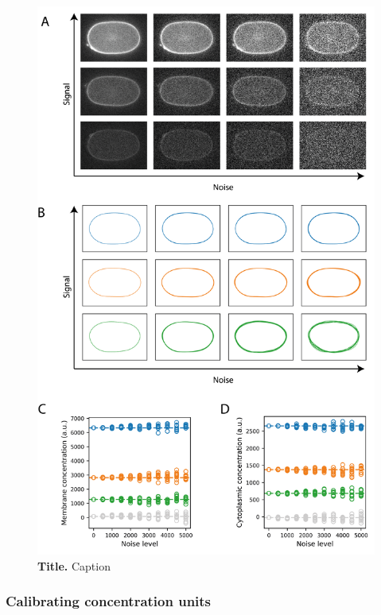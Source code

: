 \documentclass[12pt]{"article"}
\newcommand{\mycaption}[2]{\caption[#1]{\textbf{#1.} #2}}
\begin{document}
\begin{figure}[!h]
\includegraphics[scale=0.85]{memquant_benchmarking_noise}
\setlength{\abovecaptionskip}{20pt}
\centering
\mycaption{Title}{Caption}
\label{fig:memquant_benchmarking_noise}
\end{figure}


\subsubsection{Calibrating concentration units}
\end{document}
